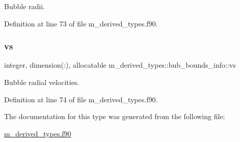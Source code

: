 Bubble radii. 



Definition at line 73 of file m\+\_\+derived\+\_\+types.\+f90.

\mbox{\label{structm__derived__types_1_1bub__bounds__info_aafe6965d5ebb0a946bda443cfdd6b840}} 
\subsubsection{\texorpdfstring{vs}{vs}}
{\footnotesize\ttfamily integer, dimension(\+:), allocatable m\+\_\+derived\+\_\+types\+::bub\+\_\+bounds\+\_\+info\+::vs}



Bubble radial velocities. 



Definition at line 74 of file m\+\_\+derived\+\_\+types.\+f90.



The documentation for this type was generated from the following file\+:\begin{DoxyCompactItemize}
\item 
\hyperlink{m__derived__types_8f90}{m\+\_\+derived\+\_\+types.\+f90}\end{DoxyCompactItemize}

